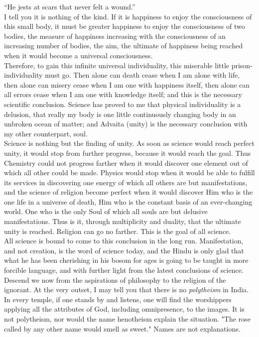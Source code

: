  “He jests at scars that never felt a wound.”\\

I tell you it is nothing of the kind. If it is happiness to
enjoy the consciousness
of this small body, it must be greater happiness to enjoy the
consciousness of two
bodies, the measure of happiness increasing with the consciousness of
an increasing
number of bodies, the aim, the ultimate of happiness being reached when
it would
become a universal consciousness.\\

Therefore, to gain this infinite universal individuality, this
miserable little
prison-individuality must go. Then alone can death cease when I am
alone with life,
then alone can misery cease when I am one with happiness itself, then
alone can all
errors cease when I am one with knowledge itself; and this is the
necessary
scientific conclusion. Science has proved to me that physical
individuality is a
delusion, that really my body is one little continuously changing body
in an
unbroken ocean of matter; and Advaita (unity) is the necessary
conclusion with my
other counterpart, soul.\\

Science is nothing but the finding of unity. As soon as
science would reach perfect
unity, it would stop from further progress, because it would reach the
goal. Thus
Chemistry could not progress farther when it would discover one element
out of which
all other could be made. Physics would stop when it would be able to
fulfill its
services in discovering one energy of which all others are but
manifestations, and
the science of religion become perfect when it would discover Him who
is the one
life in a universe of death, Him who is the constant basis of an
ever-changing world.
One who
is the only Soul of which all
souls are but delusive manifestations. Thus is it,
through multiplicity and duality, that the ultimate unity is reached.
Religion can go
no farther. This is the goal of all science.\\

All science is bound to come to this conclusion in the long
run. Manifestation, and
not creation, is the word of science today, and the Hindu is only glad
that what he
has been cherishing in his bosom for ages is going to be taught in more
forcible
language, and with further light from the latest conclusions of science.\\

Descend we now from the aspirations of philosophy to the
religion of the ignorant.
At the very outset, I may tell you that there is no  \textit{polytheism}
in India.
In every temple, if one stands by and listens, one will find the
worshippers applying
all the attributes of God, including omnipresence, to the images. It is
not polytheism,
nor would the name henotheism explain the situation. "The rose called
by any
other name would smell as sweet." Names are not explanations.\\

